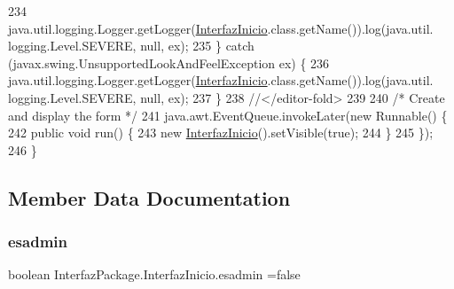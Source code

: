 \begin{DoxyCode}
234             java.util.logging.Logger.getLogger(\mbox{\hyperlink{class_interfaz_package_1_1_interfaz_inicio_ab0f2775716e858910156769284c39718}{InterfazInicio}}.class.getName()).log(java.util.
      logging.Level.SEVERE, null, ex);
235         \} \textcolor{keywordflow}{catch} (javax.swing.UnsupportedLookAndFeelException ex) \{
236             java.util.logging.Logger.getLogger(\mbox{\hyperlink{class_interfaz_package_1_1_interfaz_inicio_ab0f2775716e858910156769284c39718}{InterfazInicio}}.class.getName()).log(java.util.
      logging.Level.SEVERE, null, ex);
237         \}
238         \textcolor{comment}{//</editor-fold>}
239 
240         \textcolor{comment}{/* Create and display the form */}
241         java.awt.EventQueue.invokeLater(\textcolor{keyword}{new} Runnable() \{
242             \textcolor{keyword}{public} \textcolor{keywordtype}{void} run() \{
243                 \textcolor{keyword}{new} \mbox{\hyperlink{class_interfaz_package_1_1_interfaz_inicio_ab0f2775716e858910156769284c39718}{InterfazInicio}}().setVisible(\textcolor{keyword}{true});
244             \}
245         \});
246     \}
\end{DoxyCode}


\subsection{Member Data Documentation}
\mbox{\label{class_interfaz_package_1_1_interfaz_inicio_a2f8c468dd4e32545f2f048a4ddbbc977}} 
\subsubsection{\texorpdfstring{esadmin}{esadmin}}
{\footnotesize\ttfamily boolean Interfaz\+Package.\+Interfaz\+Inicio.\+esadmin =false\hspace{0.3cm}{\ttfamily [static]}}

\mbox{\label{class_interfaz_package_1_1_interfaz_inicio_a54823fb9c7f6a7a2f1916e2be22cbb4b}} 
